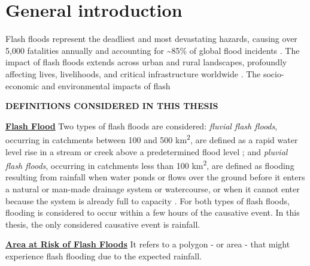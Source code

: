 \chapter{General introduction}
\label{general_introduction}
\graphicspath{{chapter_01/figures}{chapter_01/tables}}



\chapterindent Flash  floods represent the deadliest and most devastating hazards, causing over 5,000 fatalities annually and accounting for \sim85\% of global flood incidents \citep{Dordevic_2020}. The impact of flash floods extends across urban and rural landscapes, profoundly affecting lives, livelihoods, and critical infrastructure worldwide \citep{Liu_2024a}. The socio-economic \citep{Ebi_2021} and environmental \citep{Zhang_2024a} impacts of flash 

\vspace*{\fill}
\begin{tcolorbox}[
  colframe=colour_body_text,
  colback=white,
  sharp corners,
  boxrule=2mm,
  left=0mm,
  right=0mm,
  toprule=0mm,
  bottomrule=0mm,
  rightrule=2mm
]
{\color{colour_body_text} 
\textbf{DEFINITIONS CONSIDERED IN THIS THESIS}

\vspace{1em}
\textbf{\uline{Flash Flood}}\newline
Two types of flash floods are considered: \textit{fluvial flash floods}, occurring in catchments between 100 and 500 km\textsuperscript{2}, are defined as a rapid water level rise in a stream or creek above a predetermined flood level \citep{NWS_2025}; and \textit{pluvial flash floods}, occurring in catchments less than 100 km\textsuperscript{2}, are defined as flooding resulting from rainfall when water ponds or flows over the ground before it enters a natural or man-made drainage system or watercourse, or when it cannot enter because the system is already full to capacity \citep{Speight_2021}. For both types of flash floods, flooding is considered to occur within a few hours of the causative event. In this thesis, the only considered causative event is rainfall.

\vspace{1em}
\textbf{\uline{Area at Risk of Flash Floods}}\newline
It refers to a polygon - or area - that might experience flash flooding due to the expected rainfall.
}
\end{tcolorbox}

